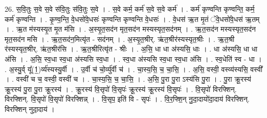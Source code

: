 \documentclass[17pt]{extarticle}
\begin{document}
26. स॒वि॒तुः स॒वे स॒वे स॑वि॒तुः स॑वि॒तुः स॒वे । . स॒वे कर्म॒ कर्म॑ स॒वे स॒वे कर्म॑ । . कर्म॑ कृण्वन्ति कृण्वन्ति॒ कर्म॒ कर्म॑ कृण्वन्ति । . कृ॒ण्व॒न्ति॒ वे॒धसो॑वे॒धसः॑ कृण्वन्ति कृण्वन्ति वे॒धसः॑ । . वे॒धस॑ ऋ॒त मृ॒तं ॅवे॒धसो॑वे॒धस॑ ऋ॒तम् । . ऋ॒त म॑स्यस्यृ॒त मृ॒त म॑सि । . अ॒स्यृ॒त॒सद॑न मृत॒सद॑न मस्यस्यृत॒सद॑नम् । . ऋ॒त॒सद॑न मस्यस्यृत॒सद॑न मृत॒सद॑न मसि । . ऋ॒त॒सद॑न॒मित्यृ॑त - सद॑नम् । . अ॒स्यृ॒त॒श्रीर्. ऋ॑त॒श्रीर॑स्यस्यृत॒श्रीः । . ऋ॒त॒श्री र॑स्यस्यृत॒श्रीर्. ऋ॑त॒श्रीर॑सि । . ऋ॒त॒श्रीरित्यृ॑त - श्रीः । . अ॒सि॒ धा धा अ॑स्यसि॒ धाः । . धा अ॑स्यसि॒ धा धा अ॑सि । . अ॒सि॒ स्व॒धा स्व॒धा अ॑स्यसि स्व॒धा । . स्व॒धा अ॑स्यसि स्व॒धा स्व॒धा अ॑सि । . स्व॒धेति॑ स्व - धा । . अ॒स्यु॒र्व् यू᳚(1॒)र्व्य॑स्यस्यु॒र्वी । . उ॒र्वी च॑ चो॒र्व्यु॑र्वी च॑ । . चा॒स्य॒सि॒ च॒ चा॒सि॒ । . अ॒सि॒ वस्वी॒ वस्व्य॑स्यसि॒ वस्वी᳚ । . वस्वी॑ च च॒ वस्वी॒ वस्वी॑ च । . चा॒स्य॒सि॒ च॒ चा॒सि॒ । . अ॒सि॒ पु॒रा पु॒रा ऽस्य॑सि पु॒रा । . पु॒रा क्रू॒रस्य॑ क्रू॒रस्य॑ पु॒रा पु॒रा क्रू॒रस्य॑ । . क्रू॒रस्य॑ वि॒सृपो॑ वि॒सृपः॑ क्रू॒रस्य॑ क्रू॒रस्य॑ वि॒सृपः॑ । . वि॒सृपो॑ विरफ्शिन्. विरफ्शिन्. वि॒सृपो॑ वि॒सृपो॑ विरफ्शिन्न् । . वि॒सृप॒ इति॑ वि - सृपः॑ । . वि॒र॒फ्शि॒न् नु॒दा॒दायो॑दा॒दाय॑ विरफ्शिन्. विरफ्शिन् नुदा॒दाय॑ । \newline
\end{document}
